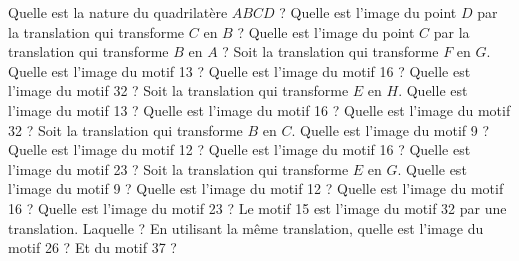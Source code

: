\documentclass["../Cours.tex"]{subfiles}
\begin{document}
\begin{questions}
    \begin{minipage}[m]{0.2\linewidth}
        \begin{center}
        \end{center}
    \end{minipage}
    \begin{minipage}{0.8\linewidth}
        \question 
            \subquestion Quelle est la nature du quadrilatère $ABCD$ ?
            \subquestion Quelle est l'image du point $D$ par la translation qui transforme $C$ en $B$ ?
            \subquestion Quelle est l'image du point $C$ par la translation qui transforme $B$ en $A$ ?
        \question Soit la translation qui transforme $F$ en $G$.
            \subquestion Quelle est l'image du motif 13 ?
            \subquestion Quelle est l'image du motif 16 ?
            \subquestion Quelle est l'image du motif 32 ?
        \question Soit la translation qui transforme $E$ en $H$.
            \subquestion Quelle est l'image du motif 13 ?
            \subquestion Quelle est l'image du motif 16 ?
            \subquestion Quelle est l'image du motif 32 ?
        \question Soit la translation qui transforme $B$ en $C$.
            \subquestion Quelle est l'image du motif 9 ?
            \subquestion Quelle est l'image du motif 12 ?
            \subquestion Quelle est l'image du motif 16 ?
            \subquestion Quelle est l'image du motif 23 ?
        \question Soit la translation qui transforme $E$ en $G$.
            \subquestion Quelle est l'image du motif 9 ?
            \subquestion Quelle est l'image du motif 12 ?
            \subquestion Quelle est l'image du motif 16 ?
            \subquestion Quelle est l'image du motif 23 ?
        \question 
            \subquestion Le motif 15 est l'image du motif 32 par une translation. Laquelle ?
            \subquestion En utilisant la même translation, quelle est l'image du motif 26 ?
            \subquestion Et du motif 37 ?
    \end{minipage}    
\end{questions}
\end{document}
